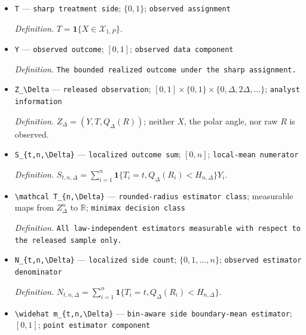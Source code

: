 \documentclass{article}
\begin{document}
\begin{itemize}
  \par\smallskip\noindent\emph{Definition.} The known Borel partition satisfies \(\mathcal X_{0,P}\cap\mathcal X_{1,P}=\varnothing\) and \(\mathcal X_{0,P}\cup\mathcal X_{1,P}=\mathcal D\); the local-mass condition implies that \(b\) lies in the closure of both sides.
  \item \texttt{T} --- \texttt{sharp treatment side}; \(\{0,1\}\); \texttt{observed assignment}
  \par\smallskip\noindent\emph{Definition.} \(T=\mathbf1\{X\in\mathcal X_{1,P}\}\).
  \item \texttt{Y} --- \texttt{observed outcome}; \([0,1]\); \texttt{observed data component}
  \par\smallskip\noindent\emph{Definition.} \texttt{The bounded realized outcome under the sharp assignment.}
  \item \texttt{Z\_\allowbreak{}\textbackslash{}\allowbreak{}Delta} --- \texttt{released observation}; \([0,1]\times\{0,1\}\times\{0,\Delta,2\Delta,\ldots\}\); \texttt{analyst information}
  \par\smallskip\noindent\emph{Definition.} \(Z_\Delta=(Y,T,Q_\Delta(R))\); neither \(X\), the polar angle, nor raw \(R\) is observed.
  \item \texttt{S\_\allowbreak{}\{t,\allowbreak{}n,\allowbreak{}\textbackslash{}\allowbreak{}Delta\}\allowbreak{}} --- \texttt{localized outcome sum}; \([0,n]\); \texttt{local-\allowbreak{}mean numerator}
  \par\smallskip\noindent\emph{Definition.} \(S_{t,n,\Delta}=\sum_{i=1}^n\mathbf 1\{T_i=t,Q_\Delta(R_i)<H_{n,\Delta}\}Y_i\).
  \item \texttt{\textbackslash{}\allowbreak{}mathcal T\_\allowbreak{}\{n,\allowbreak{}\textbackslash{}\allowbreak{}Delta\}\allowbreak{}} --- \texttt{rounded-\allowbreak{}radius estimator class}; measurable maps from \(Z_\Delta^n\) to \(\mathbb R\); \texttt{minimax decision class}
  \par\smallskip\noindent\emph{Definition.} \texttt{All law-\allowbreak{}independent estimators measurable with respect to the released sample only.}
  \item \texttt{N\_\allowbreak{}\{t,\allowbreak{}n,\allowbreak{}\textbackslash{}\allowbreak{}Delta\}\allowbreak{}} --- \texttt{localized side count}; \(\{0,1,\ldots,n\}\); \texttt{observed estimator denominator}
  \par\smallskip\noindent\emph{Definition.} \(N_{t,n,\Delta}=\sum_{i=1}^n\mathbf1\{T_i=t,Q_\Delta(R_i)<H_{n,\Delta}\}\).
  \item \texttt{\textbackslash{}\allowbreak{}widehat m\_\allowbreak{}\{t,\allowbreak{}n,\allowbreak{}\textbackslash{}\allowbreak{}Delta\}\allowbreak{}} --- \texttt{bin-\allowbreak{}aware side boundary-\allowbreak{}mean estimator}; \([0,1]\); \texttt{point estimator component}

\end{itemize}
\end{document}
